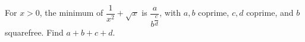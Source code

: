 For $x>0$, the minimum of $\dfrac{1}{x^2}+\sqrt x$ is $\dfrac{a}{b^{\dfrac{c}{d}}}$, with $a,b$ coprime, $c,d$ coprime, and $b$ squarefree. Find $a+b+c+d$.
